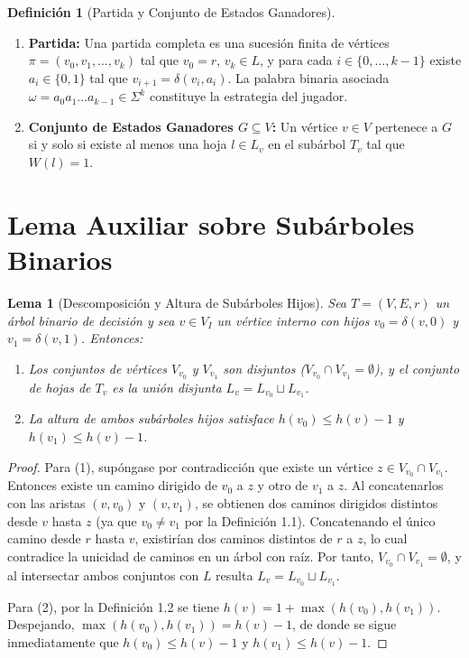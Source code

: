 \documentclass[11pt, a4paper]{article}
\theoremstyle{definition}
\newtheorem{definition}{Definición}[section]
\theoremstyle{plain}
\newtheorem{lemma}{Lema}[section]
\begin{document}
\begin{definition}[Partida y Conjunto de Estados Ganadores]
\begin{enumerate}[noitemsep, topsep=2pt]
    \item \textbf{Partida:} Una partida completa es una sucesión finita de vértices $\pi = (v_0, v_1, \dots, v_k)$ tal que $v_0 = r$, $v_k \in L$, y para cada $i \in \{0, \dots, k-1\}$ existe $a_i \in \{0, 1\}$ tal que $v_{i+1} = \delta(v_i, a_i)$. La palabra binaria asociada $\omega = a_0 a_1 \dots a_{k-1} \in \Sigma^k$ constituye la estrategia del jugador.
    \item \textbf{Conjunto de Estados Ganadores $G \subseteq V$:} Un vértice $v \in V$ pertenece a $G$ si y solo si existe al menos una hoja $l \in L_v$ en el subárbol $T_v$ tal que $W(l) = 1$.
\end{enumerate}
\end{definition}

\section{Lema Auxiliar sobre Subárboles Binarios}

\begin{lemma}[Descomposición y Altura de Subárboles Hijos]
Sea $T = (V, E, r)$ un árbol binario de decisión y sea $v \in V_I$ un vértice interno con hijos $v_0 = \delta(v, 0)$ y $v_1 = \delta(v, 1)$. Entonces:
\begin{enumerate}[noitemsep, topsep=2pt]
    \item Los conjuntos de vértices $V_{v_0}$ y $V_{v_1}$ son disjuntos ($V_{v_0} \cap V_{v_1} = \emptyset$), y el conjunto de hojas de $T_v$ es la unión disjunta $L_v = L_{v_0} \sqcup L_{v_1}$.
    \item La altura de ambos subárboles hijos satisface $h(v_0) \leq h(v) - 1$ y $h(v_1) \leq h(v) - 1$.
\end{enumerate}
\end{lemma}

\begin{proof}
Para (1), supóngase por contradicción que existe un vértice $z \in V_{v_0} \cap V_{v_1}$. Entonces existe un camino dirigido de $v_0$ a $z$ y otro de $v_1$ a $z$. Al concatenarlos con las aristas $(v, v_0)$ y $(v, v_1)$, se obtienen dos caminos dirigidos distintos desde $v$ hasta $z$ (ya que $v_0 \neq v_1$ por la Definición 1.1). Concatenando el único camino desde $r$ hasta $v$, existirían dos caminos distintos de $r$ a $z$, lo cual contradice la unicidad de caminos en un árbol con raíz. Por tanto, $V_{v_0} \cap V_{v_1} = \emptyset$, y al intersectar ambos conjuntos con $L$ resulta $L_v = L_{v_0} \sqcup L_{v_1}$.

Para (2), por la Definición 1.2 se tiene $h(v) = 1 + \max(h(v_0), h(v_1))$. Despejando, $\max(h(v_0), h(v_1)) = h(v) - 1$, de donde se sigue inmediatamente que $h(v_0) \leq h(v) - 1$ y $h(v_1) \leq h(v) - 1$.
\end{proof}
\end{document}
